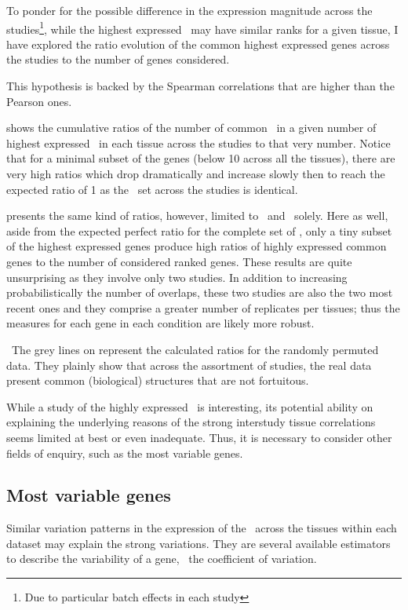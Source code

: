 To ponder for the possible difference in the expression magnitude
across the studies\footnote{Due to particular batch effects in each study},
while the highest expressed \pc\ may have similar ranks
for a given tissue,
I have explored the ratio evolution of the common highest expressed
genes across the studies to the number of genes considered.

This hypothesis is backed by the Spearman correlations that are higher
than the Pearson ones.

 shows the cumulative ratios of the number of
common \pcgs\ in a given number of highest expressed \pcgs\
in each tissue across the studies to that very number.
Notice that for a minimal subset of the genes
(below 10 across all the tissues),
there are very high ratios which drop dramatically and increase slowly then
to reach the expected ratio of 1 as the \pcgs\ set
across the studies is identical.

 presents the same kind of ratios,
however, limited to \uhlen\ and \gtex\ solely.
Here as well, aside from the expected perfect ratio for the complete set of
\pcgs,
only a tiny subset of the highest expressed genes produce high ratios of
highly expressed common genes to the number of considered ranked genes.
These results are quite unsurprising as they involve only two studies.
In addition to increasing probabilistically the number of overlaps,
these two studies are also the two most recent ones
and they comprise a greater number of replicates per tissues;
thus the measures for each gene in each condition are likely more robust.

\NB\ The grey lines on  represent
the calculated ratios for the randomly permuted data.
They plainly show that across the assortment of studies,
the real data present common (biological) structures
that are not fortuitous.

While a study of the highly expressed \pcgs\ is interesting,
its potential ability on explaining the underlying reasons
of the strong interstudy tissue correlations seems limited at best
or even inadequate.
Thus, it is necessary to consider other fields of enquiry,
such as the most variable genes.

\subsection{Most variable genes}

Similar variation patterns in the expression of the \pcgs\
across the tissues within each dataset
may explain the strong variations.
They are several available estimators to describe the variability of a gene,
\eg\ the coefficient of variation.

